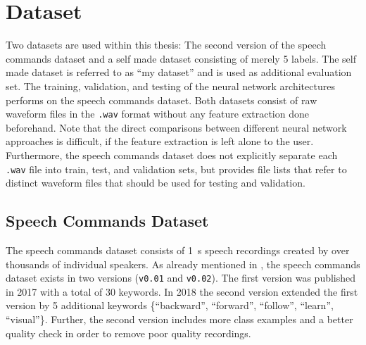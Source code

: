 
\section{Dataset}\label{sec:exp_dataset}
Two datasets are used within this thesis: The second version of the speech commands dataset \cite{Warden2018SpeechCommands} and a self made dataset consisting of merely 5 labels.
The self made dataset is referred to as \enquote{my dataset} and is used as additional evaluation set.
The training, validation, and testing of the neural network architectures performs on the speech commands dataset.
Both datasets consist of raw waveform files in the \texttt{.wav} format without any feature extraction done beforehand.
Note that the direct comparisons between different neural network approaches is difficult, if the feature extraction is left alone to the user.
Furthermore, the speech commands dataset does not explicitly separate each \texttt{.wav} file into train, test, and validation sets, but provides file lists that refer to distinct waveform files that should be used for testing and validation.



\subsection{Speech Commands Dataset}\label{sec:exp_dataset_speech_cmd}
The speech commands dataset \cite{Warden2018SpeechCommands} consists of \SI{1}{\second} speech recordings created by over thousands of individual speakers.
As already mentioned in , the speech commands dataset exists in two versions (\texttt{v0.01} and \texttt{v0.02}).
The first version was published in 2017 with a total of 30 keywords.
In 2018 the second version extended the first version by 5 additional keywords \{\enquote{backward}, \enquote{forward}, \enquote{follow}, \enquote{learn}, \enquote{visual}\}.
Further, the second version includes more class examples and a better quality check in order to remove poor quality recordings.

